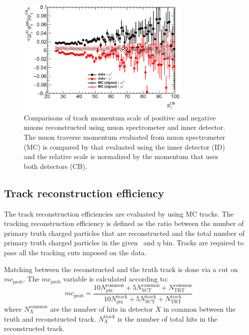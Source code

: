 \begin{figure}[h]
\centerline{
\includegraphics[width=0.75\textwidth]{figures/main/corrections/MuonPerf.pdf}
}
\caption{Comparisons of track momentum scale of positive and negative muons reconstructed using muon spectrometer and inner detector.
The muon traverse momentum evaluated from muon spectrometer (MC) is compared by that evaluated using the inner detector (ID) and the relative scale is normalized by the momentum that uses both detectors (CB).
\cite{Bold:2194917}}
\label{Fig:ChMomentumScale}
\end{figure}



\subsection{Track reconstruction efficiency}
\label{sec:trackreco}

The track reconstruction efficiencies are evaluated by using MC tracks.
The tracking reconstruction efficiency is defined as the ratio between the number of primary truth charged particles that are reconstructed and the total number of primary truth charged particles in the given \pt\ and $\eta$ bin.
Tracks are required to pass all the tracking cuts imposed on the data.


Matching between the reconstructed and the truth track is done via a cut on $mc_{\mathrm{prob}}$.
The $mc_{\mathrm{prob}}$ variable is calculated according to:
\begin{equation}
mc_{\mathrm{prob}} = \frac{10N^{\mathrm{common}}_{\mathrm{pix}} + 5N^{\mathrm{common}}_{\mathrm{SCT}} + N^{\mathrm{common}}_{\mathrm{TRT}}}{10N^{\mathrm{track}}_{\mathrm{pix}} + 5 N^{\mathrm{track}}_{\mathrm{SCT}} + N^{\mathrm{track}}_{\mathrm{TRT}}
\label{eq:mc_prob}}
\end{equation}
 where $N^{\mathrm{common}}_X$  are the number of hits in detector $X$ in common between the truth and reconstructed track.
 $N^{\mathrm{track}}_X$ is the number
of total hits in the reconstructed track.
 
